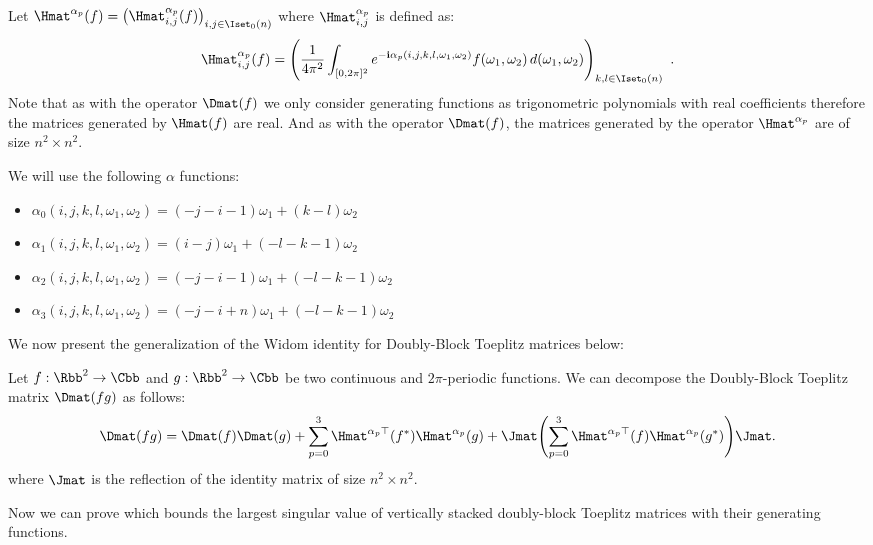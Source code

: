 Let $\Hmat^{\alpha_p} (f) = \leftmat \Hmat^{\alpha_p}_{i,j}(f) \rightmat_{i,j \in \Iset_0(n)}$ where $\Hmat^{\alpha_p}_{i,j}$ is defined as:
\begin{equation}
  \Hmat^{\alpha_p}_{i,j}(f) =\leftmat \frac{1}{4\pi^{2}}\int_{[0,2\pi]^{2}} e^{-\ci \alpha_p(i, j, k, l, \omega_1, \omega_2)}  f(\omega_{1},\omega_{2})\,d(\omega_{1},\omega_{2})
  \rightmat_{k,l \in \Iset_0(n)} \enspace.
\end{equation}
Note that as with the operator $\Dmat(f)$ we only consider generating functions as trigonometric polynomials with real coefficients therefore the matrices generated by $\Hmat(f)$ are real. 
And as with the operator $\Dmat(f)$, the matrices generated by the operator $\Hmat^{\alpha_p}$ are of size $n^2 \times n^2$. 

\noindent
We will use the following $\alpha$ functions:
\begin{itemize}
    \item[] $\alpha_0(i, j, k, l, \omega_1, \omega_2) = (-j-i-1)\omega_1 + (k-l)\omega_2$
    \item[] $\alpha_1(i, j, k, l, \omega_1, \omega_2) = (i-j)\omega_1 + (-l-k-1)\omega_2$
    \item[] $\alpha_2(i, j, k, l, \omega_1, \omega_2) = (-j-i-1)\omega_1 + (-l-k-1)\omega_2$
    \item[] $\alpha_3(i, j, k, l, \omega_1, \omega_2) = (-j-i+n)\omega_1 + (-l-k-1)\omega_2$
\end{itemize}

\noindent
We now present the generalization of the Widom identity for Doubly-Block Toeplitz matrices below:
\begin{lemma} \label{lemma:ch5-widom_idenity}
  Let $f:\Rbb^2 \rightarrow \Cbb$ and $g:\Rbb^2 \rightarrow \Cbb$ be two continuous and $2\pi$-periodic functions. 
  We can decompose the Doubly-Block Toeplitz matrix $\Dmat(fg)$ as follows:
  \begin{equation}
      \Dmat(fg) = \Dmat(f)\Dmat(g) + \sum_{p=0}^3 \Hmat^{\alpha_p \top}(f^*) \Hmat^{\alpha_p}(g) + \Jmat \left( \sum_{p=0}^3 \Hmat^{\alpha_p \top}(f) \Hmat^{\alpha_p }(g^*) \right) \Jmat.
  \end{equation}
  where $\Jmat$ is the reflection of the identity matrix of size $n^2 \times n^2$.
\end{lemma}

\noindent
Now we can prove  which bounds the largest singular value of vertically stacked doubly-block Toeplitz matrices with their generating functions. 

